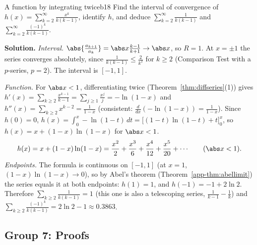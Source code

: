 \documentclass[11pt]{article}
\begin{document}
\begin{exmp}{A function by integrating twice}{b18}
Find the interval of convergence of $h(x)=\displaystyle\sum_{k=2}^\infty\frac{x^k}{k(k-1)}$, identify $h$, and deduce $\displaystyle\sum_{k=2}^\infty\frac1{k(k-1)}$ and $\displaystyle\sum_{k=2}^\infty\frac{(-1)^k}{k(k-1)}$.

\textbf{Solution.} \emph{Interval.} $\abs{\frac{a_{k+1}}{a_k}}=\abs x\frac{k-1}{k+1}\to\abs x$, so $R=1$. At $x=\pm1$ the series converges absolutely, since $\frac1{k(k-1)}\le\frac2{k^2}$ for $k\ge2$ (Comparison Test with a $p$-series, $p=2$). The interval is $[-1,1]$.

\emph{Function.} For $\abs x<1$, differentiating twice (Theorem~\ref{thm:diffseries}(1)) gives $h'(x)=\sum_{k\ge2}\frac{x^{k-1}}{k-1}=\sum_{j\ge1}\frac{x^j}j=-\ln(1-x)$ and $h''(x)=\sum_{k\ge2}x^{k-2}=\frac1{1-x}$ (consistent: $\frac d{dx}(-\ln(1-x))=\frac1{1-x}$). Since $h(0)=0$, $h(x)=\int_0^x-\ln(1-t)\,dt=\bigl[(1-t)\ln(1-t)+t\bigr]_0^x$, so $h(x)=x+(1-x)\ln(1-x)$ for $\abs x<1$.
\[
h(x)=x+(1-x)\ln(1-x)=\frac{x^2}2+\frac{x^3}6+\frac{x^4}{12}+\frac{x^5}{20}+\cdots\qquad(\abs x<1).
\]
\emph{Endpoints.} The formula is continuous on $[-1,1]$ (at $x=1$, $(1-x)\ln(1-x)\to0$), so by Abel's theorem (Theorem~\ref{app-thm:abellimit}) the series equals it at both endpoints: $h(1)=1$, and $h(-1)=-1+2\ln2$. Therefore $\sum_{k\ge2}\frac1{k(k-1)}=1$ (this one is also a telescoping series, $\frac1{k-1}-\frac1k$) and $\sum_{k\ge2}\frac{(-1)^k}{k(k-1)}=2\ln2-1\approx0.3863$.
\end{exmp}

\subsection*{Group 7: Proofs}
\end{document}
